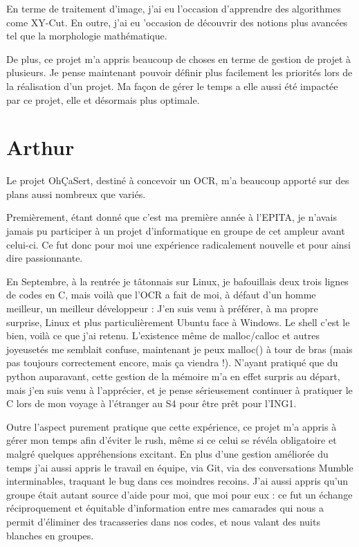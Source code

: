 \documentclass[11pt]{report}
\begin{document}
En terme de traitement d'image, j'ai eu l'occasion d'apprendre des algorithmes come XY-Cut. En outre, j'ai eu 'occasion de découvrir des notions plus avancées tel que la morphologie mathématique.

De plus, ce projet m'a appris beaucoup de choses en terme de gestion de projet à plusieurs. Je pense maintenant pouvoir définir plus facilement les priorités lors de la réalisation d'un projet. Ma façon de gérer le temps a elle aussi été impactée par ce projet, elle et désormais plus optimale.

\section{Arthur}

Le projet OhÇaSert, destiné à concevoir un OCR, m’a beaucoup apporté sur des plans aussi nombreux que variés.

Premièrement, étant donné que c’est ma première année à l’EPITA, je n’avais jamais pu participer à un projet d’informatique en groupe de cet ampleur avant celui-ci. Ce fut donc pour moi une expérience radicalement nouvelle et pour ainsi dire passionnante.

En Septembre, à la rentrée je tâtonnais sur Linux, je bafouillais deux trois lignes de codes en C, mais voilà que l’OCR a fait de moi, à défaut d’un homme meilleur, un meilleur développeur : J’en suis venu à préférer, à ma propre surprise, Linux et plus particulièrement Ubuntu face à Windows. Le shell c’est le bien, voilà ce que j’ai retenu. L’existence même de malloc/calloc et autres joyeusetés me semblait confuse, maintenant je peux malloc() à tour de bras (mais pas toujours correctement encore, mais ça viendra !). N’ayant pratiqué que du python auparavant, cette gestion de la mémoire m’a en effet surpris au départ, mais j’en suis venu à l’apprécier, et je pense sérieusement continuer à pratiquer le C lors de mon voyage à l’étranger au S4 pour être prêt pour l'ING1.

Outre l’aspect purement pratique que cette expérience, ce projet m’a appris à gérer mon temps afin d'éviter le rush, même si ce celui se révéla obligatoire et malgré quelques appréhensions excitant. En plus d’une gestion améliorée du temps j’ai aussi appris le travail en équipe, via Git, via des conversations Mumble interminables, traquant le bug dans ces moindres recoins. J’ai aussi appris qu’un groupe était autant source d’aide pour moi, que moi pour eux : ce fut un échange réciproquement et équitable d’information entre mes camarades qui nous a permit d’éliminer des tracasseries dans nos codes, et nous valant des nuits blanches en groupes.
\end{document}
